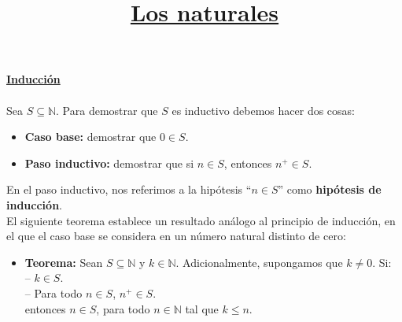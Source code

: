 \documentclass[10 pt]{article}
\title{\textbf{\underline{Los naturales}}}
\author{}
\date{}
\begin{document}
\pagestyle{empty}
\maketitle
\thispagestyle{empty}

\section*{}

\LARGE{\textbf{\underline{Inducción}}}\\ \\

\Large{Sea $S \subseteq \mathbb N$. Para demostrar que $S$ es inductivo debemos hacer dos cosas:} \\

\begin{itemize}
    \item \Large{\textbf{Caso base:} demostrar que $0 \in S$.} \\

    \item \Large{\textbf{Paso inductivo:} demostrar que si $n \in S$, entonces $n^+ \in S$.} \\
\end{itemize}

\Large{En el paso inductivo, nos referimos a la hipótesis ``$n \in S$'' como \textbf{hipótesis de inducción}. \\

El siguiente teorema establece un resultado análogo al principio de inducción, en el que el caso base se considera en un número natural distinto de cero:} \\

\begin{itemize}
    \item \Large{\textbf{Teorema:} Sean $S \subseteq \mathbb N$ y $k \in \mathbb N$. Adicionalmente, supongamos que $k \neq 0$. Si: \\

    -- $k \in S$. \\

    -- Para todo $n \in S$, $n^+ \in S$. \\

    entonces $n \in S$, para todo $n \in \mathbb N$ tal que $k \leq n$.} \\
\end{itemize}
\end{document}
